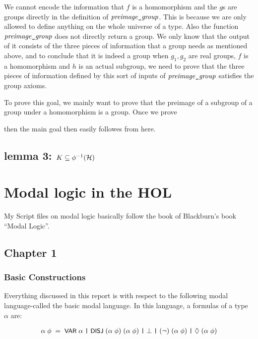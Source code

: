 \documentclass{report}
\renewcommand{\HOLConst}[1]{{\textsf{\upshape\small #1}}}
\renewcommand{\HOLinline}[1]{\ensuremath{#1}}
\newenvironment{holmath}{\begin{displaymath}\begin{array}{l}}{\end{array}\end{displaymath}\ignorespacesafterend}
\begin{document}
We cannot encode the information that $f$ is a homomorphism and the $g$s are groups directly in the definition of \HOLinline{\HOLFreeVar{preimage\HOLTokenUnderscore{}group}}. This is because we are only allowed to define anything on the whole universe of a type. Also the function \HOLinline{\HOLFreeVar{preimage\HOLTokenUnderscore{}group}} does not directly return a group. We only know that the output of it consists of the three pieces of information that a group needs as mentioned above, and to conclude that it is indeed a group when $g_1,g_2$ are real groups, $f$ is a homomorphism and $h$ is an actual subgroup, we need to prove that the three pieces of information defined by this sort of inputs of \HOLinline{\HOLFreeVar{preimage\HOLTokenUnderscore{}group}} satisfies the group axioms.

To prove this goal, we mainly want to prove that the preimage of a subgroup of a group under a homomorphism is a group. Once we prove

then the main goal then easily followes from here.

\subsection{lemma 3: $K\subseteq\phi^{-1}({\cal H})$}

\section{Modal logic in the HOL}

My Script files on modal logic basically follow the book of Blackburn's book ``Modal Logic''.

\subsection{Chapter 1}
\subsubsection{Basic Constructions}

Everything discussed in this report is with respect to the following modal language-called the basic modal language. In this language, a formulas of a type $\alpha$ are:

\begin{holmath}
\ensuremath{\alpha}\;\HOLTyOp{\ensuremath{\phi}}\;=\;\HOLConst{VAR}\;\ensuremath{\alpha}\;\HOLTokenBar{}\;\HOLConst{DISJ}\;(\ensuremath{\alpha}\;\HOLTyOp{\ensuremath{\phi}})\;(\ensuremath{\alpha}\;\HOLTyOp{\ensuremath{\phi}})\;\HOLTokenBar{}\;\HOLSymConst{\ensuremath{\bot}}\;\HOLTokenBar{}\;(\HOLSymConst{\HOLTokenNeg{}})\;(\ensuremath{\alpha}\;\HOLTyOp{\ensuremath{\phi}})\;\HOLTokenBar{}\;\HOLSymConst{\ensuremath{\Diamond}}\;(\ensuremath{\alpha}\;\HOLTyOp{\ensuremath{\phi}})
\end{holmath}
\end{document}
